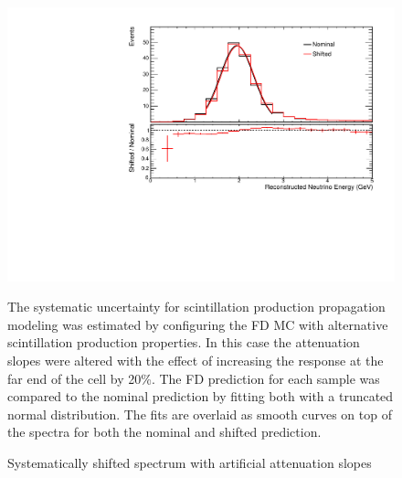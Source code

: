 {\begin{figure}
\begin{center}
\includegraphics[width=\textwidth]{figures/systs/params/fd_slopecal.pdf}
\end{center}
\caption{Systematically shifted spectrum with artificial attenuation slopes}{
The systematic uncertainty for scintillation production propagation modeling
was estimated by configuring the FD MC with alternative
scintillation production properties.
In this case the attenuation slopes were altered with the effect
of increasing the response at the far end of the cell by 20\%.
The FD prediction for each sample was compared to the nominal prediction
by fitting both with a truncated normal distribution.
The fits are overlaid as smooth curves on top of the spectra for both
the nominal and shifted prediction.
}
\label{syst_param_slopecal}
\end{figure}



}
